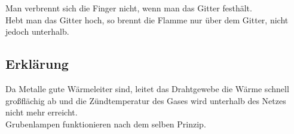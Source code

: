 Man verbrennt sich die Finger nicht, wenn man das Gitter festhält.\\
Hebt man das Gitter hoch, so brennt die Flamme nur über dem Gitter, nicht jedoch unterhalb.

\subsection{Erklärung}

Da Metalle gute Wärmeleiter sind, leitet das Drahtgewebe die Wärme schnell großflächig ab und die Zündtemperatur des Gases wird unterhalb des Netzes nicht mehr erreicht.\\
Grubenlampen funktionieren nach dem selben Prinzip.
